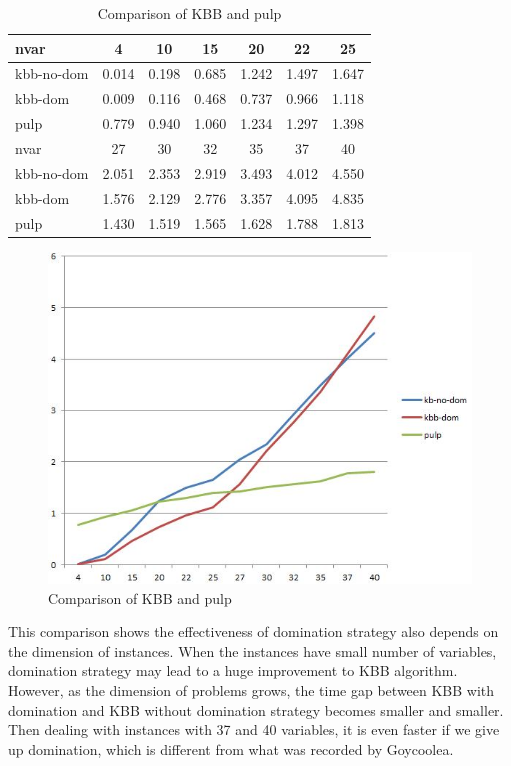 \documentclass[a4paper,11pt]{article}
\begin{document}
\begin{table}[H]
\begin{center}
\begin{tabular}{l c c c c c c}
\hline
nvar&4&10&15&20&22&25\\
\hline
kbb-no-dom&0.014&0.198&0.685&1.242&1.497 &1.647\\
kbb-dom&0.009&0.116&0.468&0.737&0.966&1.118\\
pulp&0.779&0.940&1.060&1.234&1.297&1.398\\
\hline\hline
nvar&27&30&32&35&37&40\\
\hline
kbb-no-dom&2.051&2.353&2.919&3.493&4.012&4.550\\
kbb-dom&1.576&2.129&2.776&3.357&4.095&4.835\\
pulp&1.430&1.519&1.565&1.628&1.788&1.813\\
\hline
\end{tabular}
\end{center}
\caption{Comparison of KBB and pulp\label{t4}}
\end{table}

\begin{figure}[H]
\begin{center}
\includegraphics[scale=0.6]{2}
\end{center}
\caption{Comparison of KBB and pulp \label{f3}}
\end{figure}

This comparison shows the effectiveness of domination strategy also depends on the dimension of instances. When the instances have small number of variables, domination strategy may lead to a huge improvement to KBB algorithm. However, as the dimension of problems grows, the time gap between KBB with domination and KBB without domination strategy becomes smaller and smaller. Then dealing with instances with 37 and 40 variables, it is even faster if we give up domination, which is different from what was recorded by Goycoolea.
\end{document}
